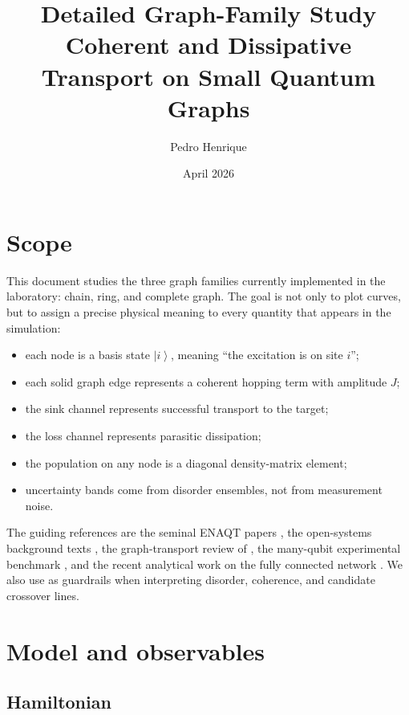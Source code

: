 \documentclass[11pt,a4paper]{article}
\title{\textbf{Detailed Graph-Family Study}\\
\large Coherent and Dissipative Transport on Small Quantum Graphs}
\author{Pedro Henrique}
\date{April 2026}
\newcommand{\ket}[1]{\left|#1\right\rangle}
\begin{document}
\maketitle
\tableofcontents
\newpage

\section{Scope}

This document studies the three graph families currently implemented in the
laboratory: chain, ring, and complete graph. The goal is not only to plot
curves, but to assign a precise physical meaning to every quantity that appears
in the simulation:
\begin{itemize}
  \item each node is a basis state $\ket{i}$, meaning ``the excitation is on site $i$'';
  \item each solid graph edge represents a coherent hopping term with amplitude $J$;
  \item the sink channel represents successful transport to the target;
  \item the loss channel represents parasitic dissipation;
  \item the population on any node is a diagonal density-matrix element;
  \item uncertainty bands come from disorder ensembles, not from measurement noise.
\end{itemize}

The guiding references are the seminal ENAQT papers
\citep{mohseni_2008, plenio_huelga_2008, rebentrost_2009, caruso_2009}, the
open-systems background texts \citep{breuer_petruccione_2007, rivas_huelga_2012},
the graph-transport review of \citet{mulken_blumen_2011}, the many-qubit
experimental benchmark \citep{maier_2019}, and the recent analytical work on
the fully connected network \citep{alterman_2024}. We also use
\citet{chin_2010,hoyer_2010,scholak_2011,novo_2016} as guardrails when
interpreting disorder, coherence, and candidate crossover lines.

\section{Model and observables}

\subsection{Hamiltonian}
\end{document}
